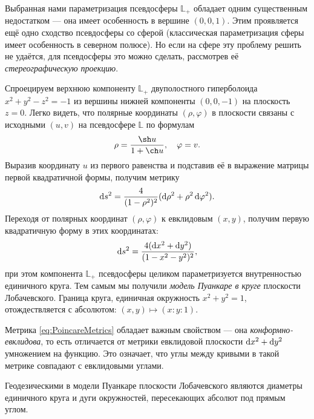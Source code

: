Выбранная нами параметризация псевдосферы $\mathbb{L}_+$ обладает одним существенным недостатком --- она имеет особенность в вершине $(0, 0, 1)$. Этим проявляется ещё одно сходство псевдосферы со сферой (классическая параметризация сферы имеет особенность в северном полюсе). Но если на сфере эту проблему решить не удаётся, для псевдосферы это можно сделать, рассмотрев её \textit{стереографическую проекцию}.

Спроецируем верхнюю компоненту $\mathbb{L}_+$ двуполостного гиперболоида $x^2 + y^2 - z^2 = -1$ из вершины нижней компоненты $(0, 0, -1)$ на плоскость $z = 0$. Легко видеть, что полярные координаты $(\rho, \varphi)$ в плоскости связаны с исходными $(u, v)$ на псевдосфере $\mathbb{L}$ по формулам
\begin{equation} \label{eq:PolarProjection}
	\rho = \frac{\sh u}{1 + \ch u},\quad\varphi = v.
\end{equation}
Выразив координату $u$ из первого равенства и подставив её в выражение матрицы первой квадратичной формы, получим метрику
\[
	\mathop{}\!\mathrm{d} s^2 = \frac{4}{(1 - \rho^2)^2}(\mathop{}\!\mathrm{d}\rho^2 + \rho^2\mathop{}\!\mathrm{d}\varphi^2).
\]
Переходя от полярных координат $(\rho, \varphi)$ к евклидовым $(x, y)$, получим первую квадратичную форму в этих координатах:
\begin{equation} \label{eq:PoincareMetrics}
	\mathop{}\!\mathrm{d} s^2 = \frac{4(\mathop{}\!\mathrm{d} x^2 + \mathop{}\!\mathrm{d} y^2)}{(1 - x^2 - y^2)^2},
\end{equation}
при этом компонента $\mathbb{L}_+$ псевдосферы целиком параметризуется внутренностью единичного круга. Тем самым мы получили \textit{модель Пуанкаре в круге} плоскости Лобачевского. Граница круга, единичная окружность $x^2 + y^2 = 1$, отождествляется с абсолютом: $(x, y) \mapsto (x : y : 1)$.

Метрика \eqref{eq:PoincareMetrics} обладает важным свойством --- она \textit{конформно-евклидова}, то есть отличается от метрики евклидовой плоскости $\mathop{}\!\mathrm{d} x^2 + \mathop{}\!\mathrm{d} y^2$ умножением на функцию. Это означает, что углы между кривыми в такой метрике совпадают с евклидовыми углами.

\begin{theorem}
	Геодезическими в модели Пуанкаре плоскости Лобачевского являются диаметры единичного круга и дуги окружностей, пересекающих абсолют под прямым углом.
\end{theorem}

